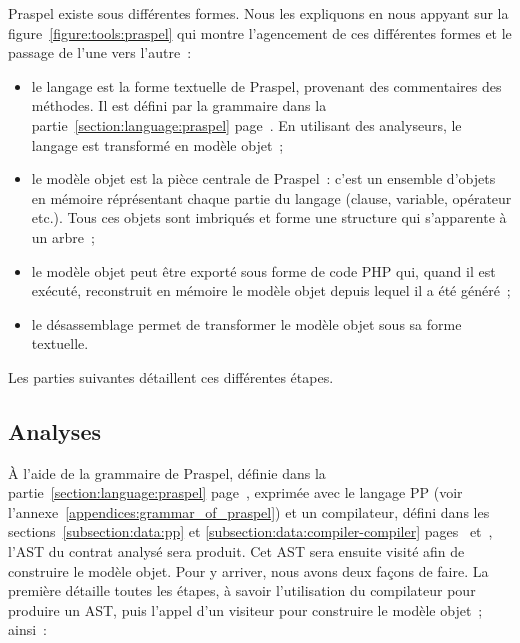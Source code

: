 Praspel existe sous différentes formes. Nous les expliquons en nous appyant sur
la figure~\ref{figure:tools:praspel} qui montre l'agencement de ces différentes
formes et le passage de l'une vers l'autre~:
%
\begin{itemize}

\item le langage est la forme textuelle de Praspel, provenant des commentaires
des méthodes. Il est défini par la grammaire dans la
partie~\ref{section:language:praspel} page~\pageref{section:language:praspel}.
En utilisant des analyseurs, le langage est transformé en modèle objet~;

\item le modèle objet  est la pièce centrale de Praspel~: c'est un
ensemble d'objets en mémoire réprésentant chaque partie du langage (clause,
variable, opérateur etc.). Tous ces objets sont imbriqués et forme une structure
qui s'apparente à un arbre~;

\item le modèle objet peut être exporté sous forme de code PHP qui, quand il est
exécuté, reconstruit en mémoire le modèle objet depuis lequel il a été généré~;

\item le désassemblage permet de transformer le modèle objet sous sa forme
textuelle.

\end{itemize}
%
Les parties suivantes détaillent ces différentes étapes.

\subsection{Analyses}
\label{subsection:tools:interpretation}

À l'aide de la grammaire de Praspel, définie dans la
partie~\ref{section:language:praspel} page~\pageref{section:language:praspel},
exprimée avec le langage PP (voir l'annexe~\ref{appendices:grammar_of_praspel})
et un compilateur, défini dans les sections~\ref{subsection:data:pp} et
\ref{subsection:data:compiler-compiler} pages~\pageref{subsection:data:pp}
et~\pageref{subsection:data:compiler-compiler}, l'AST du contrat analysé sera
produit. Cet AST sera ensuite visité afin de construire le modèle objet. Pour y
arriver, nous avons deux façons de faire. La première détaille toutes les
étapes, à savoir l'utilisation du compilateur pour produire un AST, puis l'appel
d'un visiteur pour construire le modèle objet~; ainsi~:

